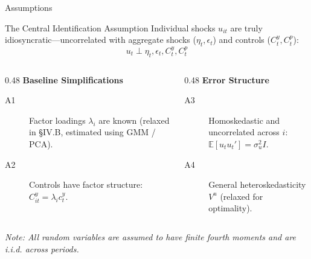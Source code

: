 \documentclass[aspectratio=169,11pt]{beamer}
\begin{document}
\begin{frame}{Assumptions}
    \label{app_assumptions}
    \vspace{-0.5em}
    \begin{block}{The Central Identification Assumption}
        Individual shocks $u_{it}$ are truly idiosyncratic—uncorrelated with aggregate shocks ($\eta_t, \epsilon_t$) and controls ($C_t^y, C_t^p$):
        \begin{equation}
            u_t \perp \eta_t, \epsilon_t, C_t^y, C_t^p
        \end{equation}
    \end{block}

    \vfill

    \begin{columns}[T]
        \begin{column}{0.48\textwidth}
            \textbf{Baseline Simplifications}
            \begin{description}
                \item[A1] Factor loadings $\lambda_i$ are known (relaxed in §IV.B, estimated using GMM / PCA).
                \item[A2] Controls have factor structure: $C_{it}^y = \lambda_i c_t^y$.
            \end{description}
        \end{column}
        \begin{column}{0.48\textwidth}
            \textbf{Error Structure}
            \begin{description}
                \item[A3] Homoskedastic and uncorrelated across $i$: $\mathbb{E}[u_t u_t'] = \sigma_u^2 I$.
                \item[A4] General heteroskedasticity $V^u$ (relaxed for optimality).
            \end{description}
        \end{column}
    \end{columns}

    \vfill
    \footnotesize
    \textit{Note: All random variables are assumed to have finite fourth moments and are i.i.d. across periods.}
    \vspace{0.1cm}
    \hfill \hyperlink{src_assumptions}{}
\end{frame}
\end{document}
